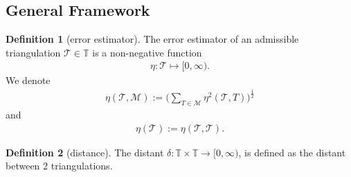 \documentclass[a4paper,12pt,oneside,fleqn]{book}
\theoremstyle{definition}
\newtheorem{definition}{Definition}[section]
\theoremstyle{remark}
\begin{document}
\subsection{General Framework}
\begin{definition}[error estimator]
The error estimator of an admissible triangulation $\mathcal{T} \in \mathbb{T}$ is a non-negative function
\begin{align*}
	\eta: \mathcal{T} \mapsto [0, \infty). 
\end{align*}
We denote
\begin{align*}
	\eta(\mathcal{T}, \mathcal{M}):= \bigg( \sum_{T \in \mathcal{M}} \eta^2(\mathcal{T}, T)\bigg)^{\frac{1}{2}}
\end{align*}
and 
\begin{align*}
	\eta(\mathcal{T}):=  \eta(\mathcal{T}, \mathcal{T}).
\end{align*}
\end{definition}

\begin{definition}[distance]
The distant $\delta: \mathbb{T} \times \mathbb{T} \rightarrow [0, \infty)$, is defined as the distant between 2 triangulations. 
\end{definition}
\end{document}
